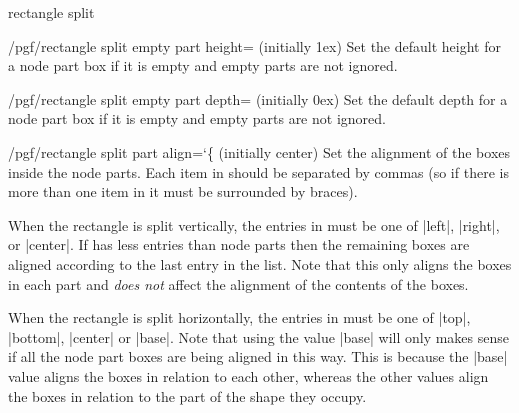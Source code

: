 \begin{shape}{rectangle split}
  \begin{key}{/pgf/rectangle split empty part height= (initially 1ex)}
    Set the default height for a node part box if it is empty and
    empty parts are not ignored.
  \end{key}
  
  \begin{key}{/pgf/rectangle split empty part depth= (initially 0ex)}
    Set the default depth for a node part box if it is empty and
    empty parts are not ignored.
  \end{key}
  
  \begin{key}{/pgf/rectangle split part align={\ttfamily\char`\{} (initially center)}
  	Set the alignment of the boxes inside the node parts.
  	Each item in  should be
  	separated by commas (so if there is more than one item in 
  	 it must be surrounded by braces).
  	
  	When the rectangle is split vertically, the entries in  
  	must be one of |left|, |right|, or |center|. If  has less 
  	entries than node parts then the remaining boxes are aligned 
  	according to the last entry in the list.    
    Note that this only aligns the boxes in each part and \emph{does not} 
    affect the alignment of the contents of the boxes.
    
\begin{codeexample}[]
\def\x{one \nodepart{two} 2 \nodepart{three} three \nodepart{four} 4}
\end{codeexample}
 
 	When the rectangle is split horizontally, the entries in  
	must be one of |top|, |bottom|, |center| or |base|. Note that using
	the value |base| will only makes sense if all the node part boxes are 
	being	aligned in this way. This is because the |base| value aligns
	the boxes in relation to each other, whereas the other values align 
	the boxes in relation to the part of the shape they occupy.



\end{key}
\end{shape}

